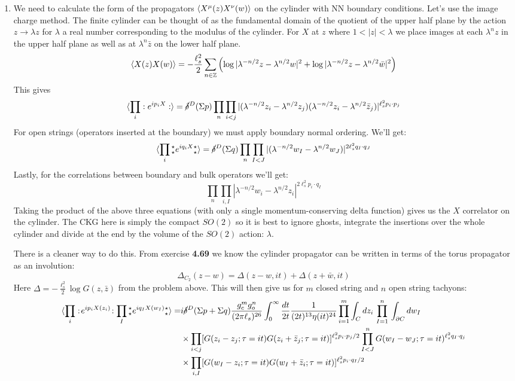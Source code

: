 \documentclass[11pt, class=article, crop=false]{standalone}
\begin{document}
\begin{enumerate}
	\item
	We need to calculate the form of the propagators $\braket{X^\mu(z) X^\nu(w)}$ on the cylinder with NN boundary conditions. Let's use the image charge method. The finite cylinder can be thought of as the fundamental domain of the quotient of the upper half plane by the action $z \to \lambda z$ for $\lambda$ a real number corresponding to the modulus of the cylinder. For $X$ at $z$ where $1<|z|<\lambda$ we place images at each $\lambda^n z$ in the upper half plane as well as at $\lambda^n \bar z$ on the lower half plane. 
	\[
		\braket{X(z) X(w)} = - \frac{\ell_s^2}{2} \sum_{n \in \mathbb{Z}} \left( \log|\lambda^{-n/2} z - \lambda^{n/2} w|^2 +  \log|\lambda^{-n/2} z - \lambda^{n/2} \bar w|^2 \right)
	\]
	This gives
	\[
		\braket{\prod_{i} :e^{i p_i X}:} = \cancel\delta^D(\Sigma p) \prod_{n} \prod_{i < j} |(\lambda^{-n/2} z_i - \lambda^{n/2} z_j) (\lambda^{-n/2} z_i - \lambda^{n/2} \bar z_j)|^{\ell_s^2 p_i \cdot p_j}
	\]
	For open strings (operators inserted at the boundary) we must apply boundary normal ordering. We'll get:
	\[
		\braket{\prod_{i} {_\star^\star} e^{i q_i X} {^\star_\star} } = \cancel\delta^D(\Sigma q) \prod_{n} \prod_{I < J} |(\lambda^{-n/2} w_I - \lambda^{n/2} w_J)|^{2 \ell_s^2 q_I \cdot q_J}
	\]	
	Lastly, for the correlations between boundary and bulk operators we'll get:
	\[
		\prod_n \prod_{i, I} |\lambda^{-n/2} w_i - \lambda^{n/2} z_i|^{2 \ell_s^2 p_i \cdot q_I}
	\]
	Taking the product of the above three equations (with only a single momentum-conserving delta function) gives us the $X$ correlator on the cylinder. The CKG here is simply the compact $SO(2)$ so it is best to ignore ghosts, integrate the insertions over the whole cylinder and divide at the end by the volume of the $SO(2)$ action: $\lambda$. 
	
	There is a cleaner way to do this. From exercise \textbf{4.69} we know the cylinder propagator can be written in terms of the torus propagator as an involution:
	\[
		\Delta_{C_2}(z- w) = \Delta(z - w, i t) + \Delta(z + \bar w, i t)
	\]
	Here $\Delta = -\frac{\ell_s^2}{2} \log G(z, \bar z)$ from the problem above. This will then give us for $m$ closed string and $n$ open string tachyons:
	\[
	\begin{aligned}
		\braket{\prod_{i} :\!e^{i p_i X(z_i)}\!: \prod_{I} {_\star^\star} e^{i q_I X(w_I)} {^\star_\star} } 
		= & i \cancel\delta^D(\Sigma p + \Sigma q) \frac{g_c^m g_o^n}{(2\pi \ell_s)^{26}} \int_0^\infty \frac{dt}{2t} \frac{1}{(2t)^{13} \eta(i t)^{24}} \prod_{i=1}^m \int_{C} dz_i \, \prod_{I=1}^n \, \int_{\partial C} dw_I  \\
		& \times \prod_{i<j} [G(z_i-z_j; \tau = it) G(z_i + \bar z_j; \tau = it)]^{\ell_s^2 p_i \cdot p_j/2}  \prod_{I<J}^n G(w_I-w_J; \tau = it)^{\ell_s^2 q_I \cdot q_j}\\
		& \times \prod_{i, I} [G(w_I - z_i; \tau = it) G(w_I + \bar z_i; \tau = i t)]^{\ell_s^2 p_i \cdot q_I/2}
	\end{aligned}
	\]
	

\end{enumerate}
\end{document}
